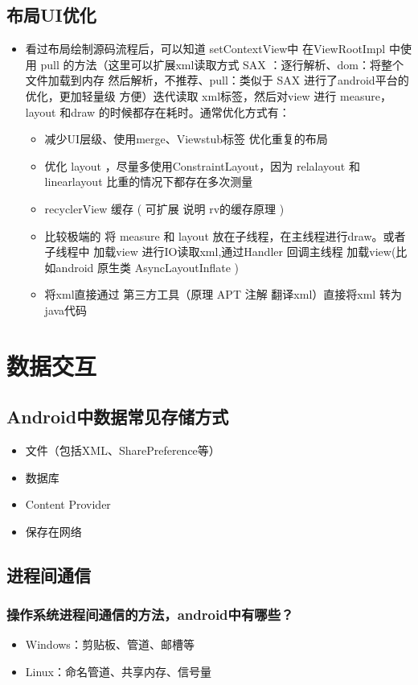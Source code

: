 \documentclass[9pt, b5paper]{article}
\begin{document}
\subsection{布局UI优化}
\label{sec-2-2}
\begin{itemize}
\item 看过布局绘制源码流程后，可以知道 setContextView中 在ViewRootImpl 中使用 pull 的方法（这里可以扩展xml读取方式 SAX ：逐行解析、dom：将整个文件加载到内存 然后解析，不推荐、pull：类似于 SAX 进行了android平台的优化，更加轻量级 方便）迭代读取 xml标签，然后对view 进行 measure，layout 和draw 的时候都存在耗时。通常优化方式有：
\begin{itemize}
\item 减少UI层级、使用merge、Viewstub标签 优化重复的布局
\item 优化 layout ，尽量多使用ConstraintLayout，因为 relalayout 和 linearlayout 比重的情况下都存在多次测量
\item recyclerView 缓存 ( 可扩展 说明 rv的缓存原理 )
\item 比较极端的 将 measure 和 layout 放在子线程，在主线程进行draw。或者 子线程中 加载view 进行IO读取xml,通过Handler 回调主线程 加载view(比如android 原生类 AsyncLayoutInflate )
\item 将xml直接通过 第三方工具（原理 APT 注解 翻译xml）直接将xml 转为 java代码
\end{itemize}
\end{itemize}


\section{数据交互}
\label{sec-3}
\subsection{Android中数据常见存储方式}
\label{sec-3-1}
\begin{itemize}
\item 文件（包括XML、SharePreference等）
\item 数据库
\item Content Provider
\item 保存在网络
\end{itemize}
\subsection{进程间通信}
\label{sec-3-2}
\subsubsection{操作系统进程间通信的方法，android中有哪些？}
\label{sec-3-2-1}
\begin{itemize}
\item Windows：剪贴板、管道、邮槽等
\item Linux：命名管道、共享内存、信号量
\end{itemize}
\end{document}
